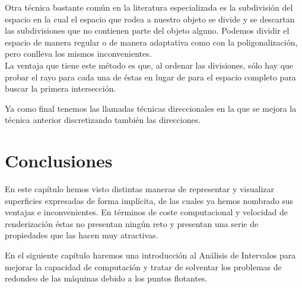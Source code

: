 Otra técnica bastante común en la literatura especializada es la subdivisión del espacio en la cual el espacio que rodea a nuestro objeto se divide y se descartan las subdivisiones que no contienen parte del objeto alguno. Podemos dividir el espacio de manera regular o de manera adaptativa como con la poligonalización, pero conlleva los mismos inconvenientes.\\ La ventaja que  tiene este método es que, al ordenar las divisiones, sólo hay que probar el rayo para cada una de éstas en lugar de para el espacio completo para buscar la primera intersección.

Ya como final tenemos las llamadas técnicas direccionales en la que se mejora la técnica anterior discretizando también las direcciones.

\section{Conclusiones}

En este capítulo hemos visto distintas maneras de representar y visualizar superficies expresadas de forma implícita, de las cuales ya hemos nombrado sus ventajas e inconvenientes. En términos de coste computacional y velocidad de renderización éstas no presentan ningún reto y presentan una serie de propiedades que las hacen muy atractivas.

En el siguiente capítulo haremos una introducción al Análisis de Intervalos para mejorar la capacidad de computación y tratar de solventar los problemas de redondeo de las máquinas debido a los puntos flotantes.